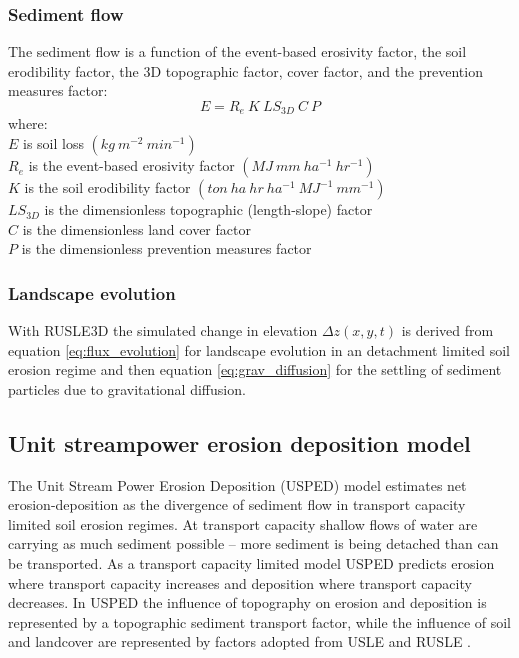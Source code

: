 \documentclass[final,3p,times,twocolumn]{elsarticle}
\begin{document}
\subsubsection{Sediment flow} 
The sediment flow is a function of the event-based erosivity factor, 
the soil erodibility factor, the 3D topographic factor, cover factor, and the prevention measures factor:
%
\begin{equation}
\label{eq:rusle}
{E = R_e ~ K ~ LS_{3D} ~ C ~ P}
\end{equation}
%
{\small
\noindent
where: \\
\noindent
\hspace*{0.5em} $E$ is soil loss $(kg ~ m^{-2} ~ min^{-1})$\\
\hspace*{0.5em} $R_e$ is the event-based erosivity factor $(MJ ~ mm ~ ha^{-1} ~ hr^{-1})$\\ %
\hspace*{0.5em} $K$ is the soil erodibility factor $(ton ~ ha ~ hr ~ ha^{-1} ~ MJ^{-1} ~ mm^{-1})$\\
\hspace*{0.5em} $LS_{3D}$ is the dimensionless topographic (length-slope) factor\\
\hspace*{0.5em} $C$ is the dimensionless land cover factor\\
\hspace*{0.5em} $P$ is the dimensionless prevention measures factor\\
}

\subsubsection{Landscape evolution}
With RUSLE3D the simulated change in elevation $\Delta z(x,y,t)$
is derived from 
equation \ref{eq:flux_evolution}
for landscape evolution in an detachment limited soil erosion regime
and then equation \ref{eq:grav_diffusion}
for the settling of sediment particles due to gravitational diffusion.


\subsection{Unit streampower erosion deposition model} \label{usped_model}
The Unit Stream Power Erosion Deposition (USPED) model 
estimates net erosion-deposition as the divergence of sediment flow
in transport capacity limited soil erosion regimes.
At transport capacity 
shallow flows of water are carrying as much sediment possible 
-- more sediment is being detached 
than can be transported.
As a transport capacity limited model
USPED predicts erosion where transport capacity increases
and deposition where transport capacity decreases. 
In USPED the influence of topography on erosion and deposition
is represented by a topographic sediment transport factor,
while the influence of soil and landcover are represented by 
factors adopted from USLE and RUSLE
\cite{Mitasova1996}.
\end{document}
